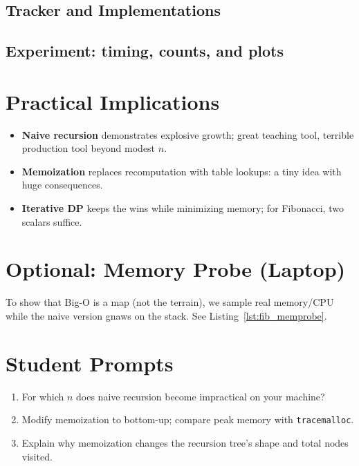 \subsection{Tracker and Implementations}


\subsection{Experiment: timing, counts, and plots}


\section{Practical Implications}
\begin{itemize}
  \item \textbf{Naive recursion} demonstrates explosive growth; great teaching tool, terrible production tool beyond modest $n$.
  \item \textbf{Memoization} replaces recomputation with table lookups: a tiny idea with huge consequences.
  \item \textbf{Iterative DP} keeps the wins while minimizing memory; for Fibonacci, two scalars suffice.
\end{itemize}

\section{Optional: Memory Probe (Laptop)}
To show that Big-O is a map (not the terrain), we sample real memory/CPU while the naive version gnaws on the stack. See Listing~\ref{lst:fib_memprobe}.


\section{Student Prompts}
\begin{enumerate}
  \item For which $n$ does naive recursion become impractical on your machine?
  \item Modify memoization to bottom-up; compare peak memory with \texttt{tracemalloc}.
  \item Explain why memoization changes the recursion tree’s shape and total nodes visited.
\end{enumerate}

